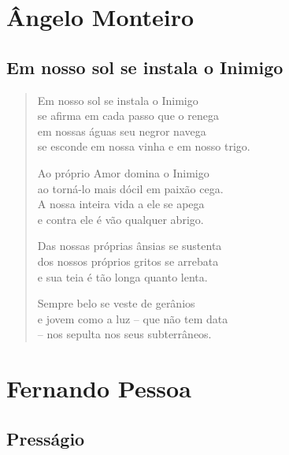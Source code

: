 \documentclass[10pt,a5paper,oneside]{book}
\begin{document}
\part{Ângelo Monteiro}

\chapter{Em nosso sol se instala o Inimigo}

\begin{verse}
Em nosso sol se instala o Inimigo\\
se afirma em cada passo que o renega\\
em nossas águas seu negror navega\\
se esconde em nossa vinha e em nosso trigo.

Ao próprio Amor domina o Inimigo\\
ao torná-lo mais dócil em paixão cega.\\
A nossa inteira vida a ele se apega\\
e contra ele é vão qualquer abrigo.

Das nossas próprias ânsias se sustenta\\
dos nossos próprios gritos se arrebata\\
e sua teia é tão longa quanto lenta.

Sempre belo se veste de gerânios\\
e jovem como a luz -- que não tem data\\
-- nos sepulta nos seus subterrâneos.
\end{verse}

\part{Fernando Pessoa}

\chapter{Presságio}
\end{document}
